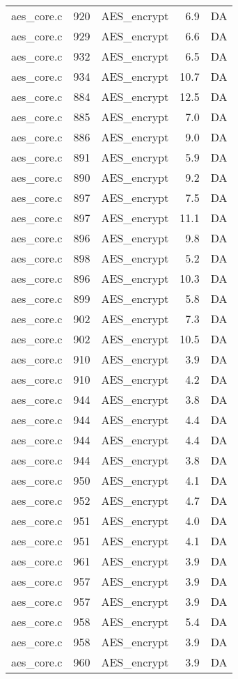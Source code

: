 \begin{table}[h!]
\begin{tabular}{lrlrr}
aes\_core.c& 920&AES\_encrypt&6.9 &DA\\
aes\_core.c& 929&AES\_encrypt&6.6 &DA\\
aes\_core.c& 932&AES\_encrypt&6.5 &DA\\
aes\_core.c& 934&AES\_encrypt&10.7 &DA\\
aes\_core.c& 884&AES\_encrypt&12.5 &DA\\
aes\_core.c& 885&AES\_encrypt&7.0 &DA\\
aes\_core.c& 886&AES\_encrypt&9.0 &DA\\
aes\_core.c& 891&AES\_encrypt&5.9 &DA\\
aes\_core.c& 890&AES\_encrypt&9.2 &DA\\
aes\_core.c& 897&AES\_encrypt&7.5 &DA\\
aes\_core.c& 897&AES\_encrypt&11.1 &DA\\
aes\_core.c& 896&AES\_encrypt&9.8 &DA\\
aes\_core.c& 898&AES\_encrypt&5.2 &DA\\
aes\_core.c& 896&AES\_encrypt&10.3 &DA\\
aes\_core.c& 899&AES\_encrypt&5.8 &DA\\
aes\_core.c& 902&AES\_encrypt&7.3 &DA\\
aes\_core.c& 902&AES\_encrypt&10.5 &DA\\
aes\_core.c& 910&AES\_encrypt&3.9 &DA\\
aes\_core.c& 910&AES\_encrypt&4.2 &DA\\
aes\_core.c& 944&AES\_encrypt&3.8 &DA\\
aes\_core.c& 944&AES\_encrypt&4.4 &DA\\
aes\_core.c& 944&AES\_encrypt&4.4 &DA\\
aes\_core.c& 944&AES\_encrypt&3.8 &DA\\
aes\_core.c& 950&AES\_encrypt&4.1 &DA\\
aes\_core.c& 952&AES\_encrypt&4.7 &DA\\
aes\_core.c& 951&AES\_encrypt&4.0 &DA\\
aes\_core.c& 951&AES\_encrypt&4.1 &DA\\
aes\_core.c& 961&AES\_encrypt&3.9 &DA\\
aes\_core.c& 957&AES\_encrypt&3.9 &DA\\
aes\_core.c& 957&AES\_encrypt&3.9 &DA\\
aes\_core.c& 958&AES\_encrypt&5.4 &DA\\
aes\_core.c& 958&AES\_encrypt&3.9 &DA\\
aes\_core.c& 960&AES\_encrypt&3.9 &DA\\
\hline
\end{tabular}
\renewcommand{\baselinestretch}{1.0}\selectfont
\end{table}
